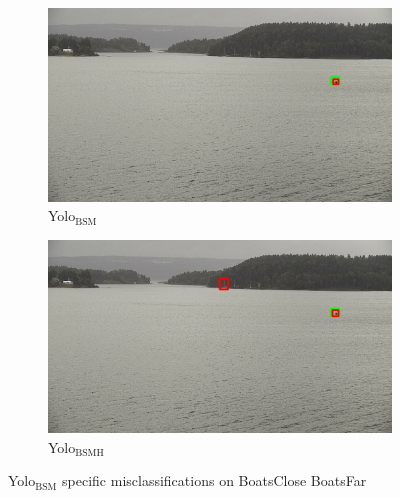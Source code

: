 \begin{figure}[h!]
\begin{subfigure}{.5\textwidth}
  \centering
  \includegraphics[width=0.9\linewidth]{results/case_buildings/yolo23/2better/yolo2/selected_08_09_frame5360.jpg}
  \caption{Yolo$_{\text{BSM}}$}
\end{subfigure}%
\begin{subfigure}{.5\textwidth}
  \centering
  \includegraphics[width=.9\linewidth]{results/case_buildings/yolo23/2better/yolo3/selected_08_09_frame5360.jpg}
  \caption{Yolo$_{\text{BSMH}}$}
\end{subfigure}
\caption{Yolo$_{\text{BSM}}$ specific misclassifications on BoatsClose BoatsFar}
\label{img:yolo2_misclas}


\end{figure}
